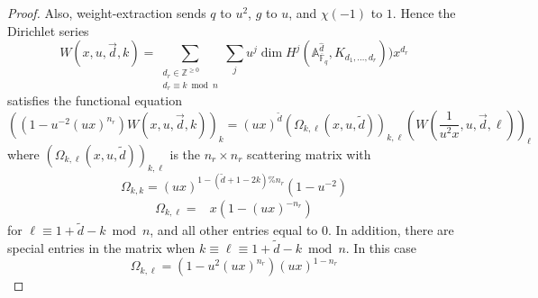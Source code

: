 \documentclass[11pt,letterpaper]{article}
\theoremstyle{definition}
\theoremstyle{remark}
\numberwithin{equation}{section}
\theoremstyle{dotless}
\renewcommand{\tilde}{\widetilde}
\begin{document}
\begin{proof}
Also, weight-extraction sends $q$ to $u^2 $, $g$ to $u$, and $\chi(-1)$ to $1$. Hence the Dirichlet series
\[ W(x,u, \vec{d},k) = \sum_{\substack{ d_r \in \mathbb Z^{\geq 0} \\ d_r \equiv k \bmod n }} \sum_j u^j \dim H^j( \mathbb A^{\hat{d} }_{\overline{\mathbb F}_q}, K_{d_1,\dots, d_r})) x^{d_r} \]
satisfies the functional equation
\begin{equation} 
\left( \left(1-u^{-2}  \left( ux \right)^{n_r}\right)  W (x,u ,  \vec{d}, k) \right)_k = (ux)^{\tilde{d} } \left( \Omega_{k, \ell}(x, u, \tilde{d}) \right)_{k, \ell} \left( W\left(\frac{1}{u^2x},u,  \vec{d}, \ell\right) \right)_{\ell}
\end{equation}
where $\left( \Omega_ {k, \ell}(x, u, \tilde{d}) \right)_{k, \ell}$ is the $n_r \times n_r$ scattering matrix with
\begin{equation*}
\Omega_{k,k} = \left( ux \right)^{1-(\tilde{d}+1-2k)\% n_r }  ( 1-u^{-2} )
\end{equation*}
\begin{equation*}
\begin{split}
\Omega_{k,\ell}=& x\left( 1-\left(ux \right)^{-n_r}\right) \end{split}
\end{equation*}
for $\ell \equiv 1+\tilde{d} -k \bmod n$, and all other entries equal to $0$. In addition, there are special entries in the matrix when $k \equiv \ell \equiv 1+\tilde{d} -k \bmod n$. In this case 
\begin{equation*}
\Omega_ {k,\ell}= \left(1-u^2 \left( ux \right)^{n_r}\right)   \left( ux\right)^{1-n_r } 
\end{equation*}


\end{proof}
\end{document}
